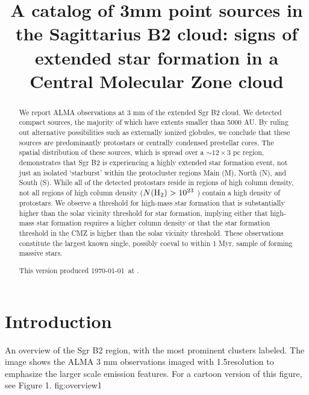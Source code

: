 \documentclass[twocolumn]{aastex61}
\begin{document}
\title{A catalog of 3mm point sources in the Sagittarius B2 cloud: signs of
extended star formation in a Central Molecular Zone cloud}

\begin{abstract}
We report ALMA observations at 3 mm  of the extended Sgr B2 cloud. We detected
\ncores compact sources, the majority of which have extents smaller than 5000
AU.  By ruling out alternative possibilities such as externally ionized
globules, we conclude that these sources are predominantly protostars or
centrally condensed prestellar cores.  The spatial distribution of these
sources, which is spread over a $\sim12\times3$ pc region, demonstrates that
Sgr B2 is experiencing a highly extended star
formation event, not just an isolated `starburst' within the protocluster
regions Main (M), North (N), and South (S).  While all of the detected
protostars reside in regions of high column density, not all regions of high
column density
($N(\textrm{H}_{2})>10^{23}$ \persc)
contain a high density of
protostars.  {\color{red} We observe a threshold} for high-mass star formation that is
substantially higher than the solar vicinity threshold for star formation, implying
either that high-mass star formation requires a higher column density or that
the star formation threshold in the CMZ is higher than the solar vicinity
threshold.  These observations constitute the largest known single, possibly
coeval to within 1 Myr, sample of forming massive stars.

This version produced \today\ at \currenttime.
\end{abstract}




\section{Introduction}

{An overview of the Sgr B2 region, with the most prominent clusters labeled.
The image shows the ALMA 3 mm observations imaged with 1.5\arcsec resolution
to emphasize the larger scale emission features.  For a cartoon version of this
figure, see \citet{Schmiedeke2016a} Figure 1.}
{fig:overview}{1}{\textwidth}
\end{document}
